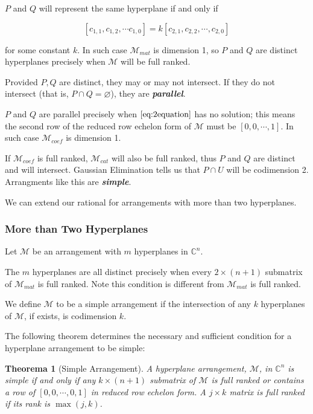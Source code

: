\documentclass[12pt, a4paper]{article}
\newtheorem{theorem}{Theorema}[subsection]
\theoremstyle{definition}
\theoremstyle{remark}
\newcommand{\bb}[1]{\mathbb{#1}}
\renewcommand{\emph}[1]{\textit{\textbf{#1}}}
\begin{document}
$P$ and $Q$ will represent the same hyperplane if and only if 

$$
[c_{1,1}, c_{1,2}, \cdots c_{1,0}] = k [c_{2,1}, c_{2,2}, \cdots, c_{2, 0}]
$$

for some constant $k$. 
In such case $\mathcal{M}_{mat}$ is dimension 1, so $P$ and $Q$ are distinct hyperplanes precisely when $\mathcal{M}$ will be full ranked. 

Provided $P, Q$ are distinct, they may or may not intersect. 
If they do not intersect (that is, $P \cap Q = \varnothing$), they are \emph{parallel}.

$P$ and $Q$ are parallel precisely when $\ref{eq:2equation}$ has no solution; this means the second row of the reduced row echelon form of $\mathcal{M}$ must be $[0, 0, \cdots, 1]$. In such case $\mathcal{M}_{coef}$ is dimension 1.

If $\mathcal{M}_{coef}$ is full ranked, $\mathcal{M}_{cat}$ will also be full ranked, thus $P$ and $Q$ are distinct and will intersect. 
Gaussian Elimination tells us that $P \cap U$ will be codimension 2. Arrangments like this are \emph{simple}.

We can extend our rational for arrangements with more than two hyperplanes.

\subsubsection{More than Two Hyperplanes}

Let $\mathcal{M}$ be an arrangement with $m$ hyperplanes in $\bb{C}^n$. 

The $m$ hyperplanes are all distinct precisely when every $2\times (n+1)$ submatrix of $\mathcal{M}_{mat}$ is full ranked. 
Note this condition is different from $\mathcal{M}_{mat}$ is full ranked.

We define $\mathcal{M}$ to be a simple arrangement if the intersection of any $k$ hyperplanes of $\mathcal{M}$, if exists, is codimension $k$.

The following theorem determines the necessary and sufficient condition for a hyperplane arrangement to be simple:

\begin{theorem}[Simple Arrangement]
	\label{th:simple_arrangement}
	A hyperplane arrangement, $\mathcal{M}$, in $\bb{C}^n$ is simple if and only if any $k \times (n+1) $ submatrix of $\mathcal{M}$ is full ranked or contains a row of $[0, 0, \cdots, 0, 1]$ in reduced row echelon form. 
	A $j \times  k$ matrix is full ranked if its rank is $\max(j,k)$.
\end{theorem}
\end{document}
